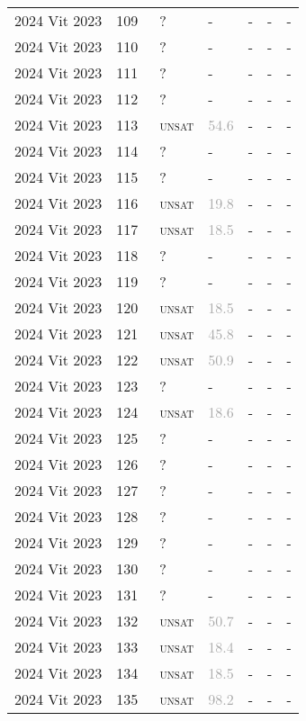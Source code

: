 \begin{center}
{\begin{longtable}{@{}lllllll@{}}
2024 Vit 2023 & 109 & ~? & - & - & - & - \\
2024 Vit 2023 & 110 & ~? & - & - & - & - \\
2024 Vit 2023 & 111 & ~? & - & - & - & - \\
2024 Vit 2023 & 112 & ~? & - & - & - & - \\
2024 Vit 2023 & 113 & ~\textsc{unsat} & \textcolor{darkgray}{54.6} & - & - & - \\
2024 Vit 2023 & 114 & ~? & - & - & - & - \\
2024 Vit 2023 & 115 & ~? & - & - & - & - \\
2024 Vit 2023 & 116 & ~\textsc{unsat} & \textcolor{darkgray}{19.8} & - & - & - \\
2024 Vit 2023 & 117 & ~\textsc{unsat} & \textcolor{darkgray}{18.5} & - & - & - \\
2024 Vit 2023 & 118 & ~? & - & - & - & - \\
2024 Vit 2023 & 119 & ~? & - & - & - & - \\
2024 Vit 2023 & 120 & ~\textsc{unsat} & \textcolor{darkgray}{18.5} & - & - & - \\
2024 Vit 2023 & 121 & ~\textsc{unsat} & \textcolor{darkgray}{45.8} & - & - & - \\
2024 Vit 2023 & 122 & ~\textsc{unsat} & \textcolor{darkgray}{50.9} & - & - & - \\
2024 Vit 2023 & 123 & ~? & - & - & - & - \\
2024 Vit 2023 & 124 & ~\textsc{unsat} & \textcolor{darkgray}{18.6} & - & - & - \\
2024 Vit 2023 & 125 & ~? & - & - & - & - \\
2024 Vit 2023 & 126 & ~? & - & - & - & - \\
2024 Vit 2023 & 127 & ~? & - & - & - & - \\
2024 Vit 2023 & 128 & ~? & - & - & - & - \\
2024 Vit 2023 & 129 & ~? & - & - & - & - \\
2024 Vit 2023 & 130 & ~? & - & - & - & - \\
2024 Vit 2023 & 131 & ~? & - & - & - & - \\
2024 Vit 2023 & 132 & ~\textsc{unsat} & \textcolor{darkgray}{50.7} & - & - & - \\
2024 Vit 2023 & 133 & ~\textsc{unsat} & \textcolor{darkgray}{18.4} & - & - & - \\
2024 Vit 2023 & 134 & ~\textsc{unsat} & \textcolor{darkgray}{18.5} & - & - & - \\
2024 Vit 2023 & 135 & ~\textsc{unsat} & \textcolor{darkgray}{98.2} & - & - & - \\

\end{longtable}}
\end{center}

